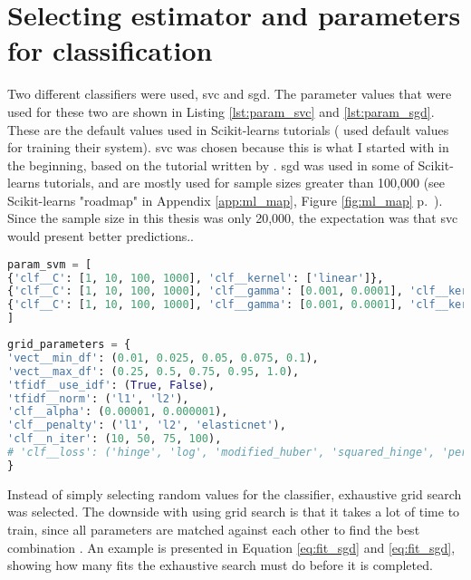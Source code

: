 \section{Selecting estimator and parameters for classification}
\label{sec:estimator_parameter_selection}
Two different classifiers were used, \gls{svc} and \gls{sgd}.
The parameter values that were used for these two are shown in Listing \ref{lst:param_svc} and  \ref{lst:param_sgd}.
These are the default values used in Scikit-learns tutorials \cite{Scikitlearn.org2016k, Scikitlearn.org2016l} (\cite{Huang2008, Maas2011, Zhang2003} used default values for training their system).
\gls{svc} was chosen because this is what I started with in the beginning, based on the tutorial written by \cite{Rehurek2014}.
\gls{sgd} was used in some of Scikit-learns tutorials, and are mostly used for sample sizes greater than 100,000 (see Scikit-learns "roadmap" in Appendix \ref{app:ml_map}, Figure \ref{fig:ml_map}  
 p.~\pageref{app:ml_map}).
Since the sample size in this thesis was only 20,000, the expectation was that \gls{svc} would present better predictions..
\begin{lstlisting}[caption={Parameters for SVC}, label={lst:param_svc}, language={Python}] 
param_svm = [
{'clf__C': [1, 10, 100, 1000], 'clf__kernel': ['linear']},
{'clf__C': [1, 10, 100, 1000], 'clf__gamma': [0.001, 0.0001], 'clf__kernel': ['rbf']},
{'clf__C': [1, 10, 100, 1000], 'clf__gamma': [0.001, 0.0001], 'clf__kernel': ['sigmoid']},
]
\end{lstlisting}
\clearpage
\begin{lstlisting}[caption={Parameters for SGD}, label={lst:param_sgd}, language={Python}] 
grid_parameters = {
'vect__min_df': (0.01, 0.025, 0.05, 0.075, 0.1),
'vect__max_df': (0.25, 0.5, 0.75, 0.95, 1.0),
'tfidf__use_idf': (True, False),
'tfidf__norm': ('l1', 'l2'),
'clf__alpha': (0.00001, 0.000001),
'clf__penalty': ('l1', 'l2', 'elasticnet'),
'clf__n_iter': (10, 50, 75, 100),
# 'clf__loss': ('hinge', 'log', 'modified_huber', 'squared_hinge', 'perceptron'),
}
\end{lstlisting}
Instead of simply selecting random values for the classifier, exhaustive grid search was selected. 
The downside with using grid search is that it takes a lot of time to train, since all parameters are matched against each other to find the best combination \cite{Bishop2006, Markham2015a}.
An example is presented in Equation \ref{eq:fit_sgd} and \ref{eq:fit_sgd}, showing how many fits the exhaustive search must do before it is completed.
